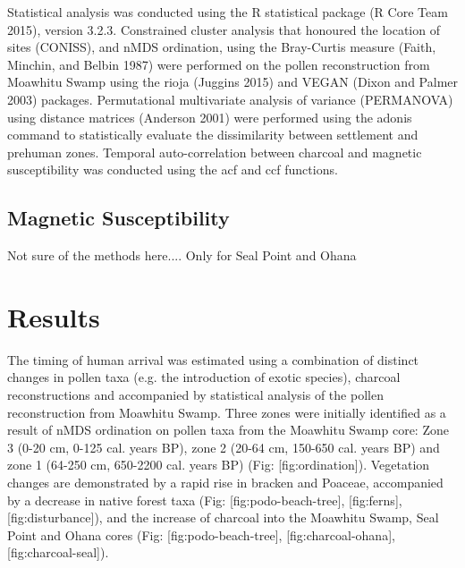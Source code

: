 Statistical analysis was conducted using the R statistical package (R
Core Team 2015), version 3.2.3. Constrained cluster analysis that
honoured the location of sites (CONISS), and nMDS ordination, using the
Bray-Curtis measure (Faith, Minchin, and Belbin 1987) were performed on
the pollen reconstruction from Moawhitu Swamp using the rioja (Juggins
2015) and VEGAN (Dixon and Palmer 2003) packages. Permutational
multivariate analysis of variance (PERMANOVA) using distance matrices
(Anderson 2001) were performed using the adonis command to statistically
evaluate the dissimilarity between settlement and prehuman zones.
Temporal auto-correlation between charcoal and magnetic susceptibility
was conducted using the acf and ccf functions.

\subsection{Magnetic Susceptibility}\label{magnetic-susceptibility}

Not sure of the methods here.... Only for Seal Point and Ohana

\section{Results}\label{results}

The timing of human arrival was estimated using a combination of
distinct changes in pollen taxa (e.g. the introduction of exotic
species), charcoal reconstructions and accompanied by statistical
analysis of the pollen reconstruction from Moawhitu Swamp. Three zones
were initially identified as a result of nMDS ordination on pollen taxa
from the Moawhitu Swamp core: Zone 3 (0-20 cm, 0-125 cal. years BP),
zone 2 (20-64 cm, 150-650 cal. years BP) and zone 1 (64-250 cm, 650-2200
cal. years BP) (Fig: {[}fig:ordination{]}). Vegetation changes are
demonstrated by a rapid rise in bracken and Poaceae, accompanied by a
decrease in native forest taxa (Fig: {[}fig:podo-beach-tree{]},
{[}fig:ferns{]}, {[}fig:disturbance{]}), and the increase of charcoal
into the Moawhitu Swamp, Seal Point and Ohana cores (Fig:
{[}fig:podo-beach-tree{]}, {[}fig:charcoal-ohana{]},
{[}fig:charcoal-seal{]}).

